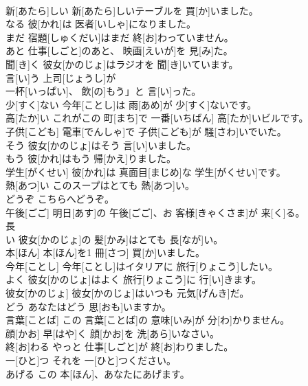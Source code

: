 \documentclass[8pt]{extreport}
\begin{document}
\begin{CJK}{UTF8}{min}
\\	新[あたら]しい	新[あたら]しいテーブルを 買[か]いました。		
\\	なる	彼[かれ]は 医者[いしゃ]になりました。		
\\	まだ	宿題[しゅくだい]はまだ 終[お]わっていません。		
\\	あと	仕事[しごと]のあと、 映画[えいが]を 見[み]た。		
\\	聞[き]く	彼女[かのじょ]はラジオを 聞[き]いています。		
\\	言[い]う	上司[じょうし]が
\\	一杯[いっぱい]、 飲[の]もう」と 言[い]った。		
\\	少[すく]ない	今年[ことし]は 雨[あめ]が 少[すく]ないです。		
\\	高[たか]い	これがこの 町[まち]で 一番[いちばん] 高[たか]いビルです。		
\\	子供[こども]	電車[でんしゃ]で 子供[こども]が 騒[さわ]いでいた。		
\\	そう	彼女[かのじょ]はそう 言[い]いました。		
\\	もう	彼[かれ]はもう 帰[かえ]りました。		
\\	学生[がくせい]	彼[かれ]は 真面目[まじめ]な 学生[がくせい]です。		
\\	熱[あつ]い	このスープはとても 熱[あつ]い。		
\\	どうぞ	こちらへどうぞ。		
\\	午後[ごご]	明日[あす]の 午後[ごご]、お 客様[きゃくさま]が 来[く]る。		
\\	長
\\	[なが]い	彼女[かのじょ]の 髪[かみ]はとても 長[なが]い。		
\\	本[ほん]	本[ほん]を1 冊[さつ] 買[か]いました。		
\\	今年[ことし]	今年[ことし]はイタリアに 旅行[りょこう]したい。		
\\	よく	彼女[かのじょ]はよく 旅行[りょこう]に 行[い]きます。		
\\	彼女[かのじょ]	彼女[かのじょ]はいつも 元気[げんき]だ。		
\\	どう	あなたはどう 思[おも]いますか。		
\\	言葉[ことば]	この 言葉[ことば]の 意味[いみ]が 分[わ]かりません。		
\\	顔[かお]	早[はや]く 顔[かお]を 洗[あら]いなさい。		
\\	終[お]わる	やっと 仕事[しごと]が 終[お]わりました。		
\\	一[ひと]つ	それを 一[ひと]つください。		
\\	あげる	この 本[ほん]、あなたにあげます。		

\end{CJK}
\end{document}
